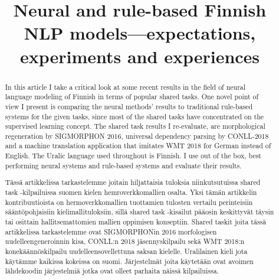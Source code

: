 \documentclass{flammie}
\newif\ifcameraready{}
\begin{document}
\ifcameraready{}
\pagestyle{empty}
\fi

\title{Neural and rule-based Finnish NLP models---expectations, experiments and
experiences
}

\ifcameraready{}
\author{Tommi A Pirinen\\
Universität Hamburg\\
Hamburger Zentrum für Sprachkorpora\\
Max-Brauer-Allee 60, D-22765 Hamburg\\
\url{tommi.antero.pirinen@uni-hamburg.de}
}
\fi

\date{}

\maketitle
\ifcameraready{}
\thispagestyle{empty}
\fi

\begin{abstract}
    In this article I take a critical look at some recent results in the
    field of neural language modeling of Finnish in terms of popular shared
    tasks. One novel point of view I present is comparing the neural methods'
    results to traditional rule-based systems for the given tasks, since most of
    the shared tasks have concentrated on the supervised learning
    concept. The shared task results I re-evaluate, are morphological
    regeneration by SIGMORPHON 2016, universal dependency parsing by CONLL-2018
    and a machine translation application that imitates WMT 2018 for German
    instead of English. The Uralic language used throughout is Finnish. I use
    out of the box, best performing neural systems and rule-based systems and
    evaluate their results.
\end{abstract}

{\
\begin{abstract}
    Tässä artikkelissa tarkastelemme joitain hiljattaisia tuloksia
    niinkutsutuissa shared task -kilpailuissa suomen kielen hemroverkkomallien
    osalta. Yksi tämän artikkelin kontribuutioista on hermoverkkomallien
    tuottamien tulosten vertailu perinteisiin sääntöpohjaisiin
    kielimallituloksiin, sillä shared task -kisailut pääosin keskittyvät täysin
    tai osittain hallitsemattomien mallien oppimisen konseptiin. Shared taskit
    joita tässä artikkelissa tarkastelemme ovat SIGMORPHONin 2016 morfologisen
    uudelleengeneroinnin kisa, CONLL:n 2018 jäsennyskilpailu sekä WMT 2018:n
    konekäännöskilpailu uudelleensovellettuna saksan kielelle. Uralilainen kieli
    jota käytämme kaikissa kokeissa on suomi. Järjestelmät joita käytetään ovat
    avoimen lähdekoodin järjestelmiä jotka ovat olleet parhaita näissä
    kilpailuissa.
\end{abstract}
}
\end{document}
